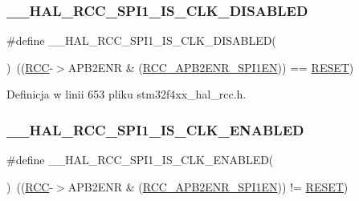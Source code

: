 \subsubsection{\texorpdfstring{\+\_\+\+\_\+\+H\+A\+L\+\_\+\+R\+C\+C\+\_\+\+S\+P\+I1\+\_\+\+I\+S\+\_\+\+C\+L\+K\+\_\+\+D\+I\+S\+A\+B\+L\+ED}{\_\_HAL\_RCC\_SPI1\_IS\_CLK\_DISABLED}}
{\footnotesize\ttfamily \#define \+\_\+\+\_\+\+H\+A\+L\+\_\+\+R\+C\+C\+\_\+\+S\+P\+I1\+\_\+\+I\+S\+\_\+\+C\+L\+K\+\_\+\+D\+I\+S\+A\+B\+L\+ED(\begin{DoxyParamCaption}{ }\end{DoxyParamCaption})~((\hyperlink{group___peripheral__declaration_ga74944438a086975793d26ae48d5882d4}{R\+CC}-\/$>$A\+P\+B2\+E\+NR \& (\hyperlink{group___peripheral___registers___bits___definition_gae08a3510371b9234eb96369c91d3552f}{R\+C\+C\+\_\+\+A\+P\+B2\+E\+N\+R\+\_\+\+S\+P\+I1\+EN})) == \hyperlink{group___exported__types_gga89136caac2e14c55151f527ac02daaffa589b7d94a3d91d145720e2fed0eb3a05}{R\+E\+S\+ET})}



Definicja w linii 653 pliku stm32f4xx\+\_\+hal\+\_\+rcc.\+h.

\mbox{\label{group___r_c_c___a_p_b2___peripheral___clock___enable___disable___status_gab1787d7cdf591c099b8d96848aee835e}} 
\subsubsection{\texorpdfstring{\+\_\+\+\_\+\+H\+A\+L\+\_\+\+R\+C\+C\+\_\+\+S\+P\+I1\+\_\+\+I\+S\+\_\+\+C\+L\+K\+\_\+\+E\+N\+A\+B\+L\+ED}{\_\_HAL\_RCC\_SPI1\_IS\_CLK\_ENABLED}}
{\footnotesize\ttfamily \#define \+\_\+\+\_\+\+H\+A\+L\+\_\+\+R\+C\+C\+\_\+\+S\+P\+I1\+\_\+\+I\+S\+\_\+\+C\+L\+K\+\_\+\+E\+N\+A\+B\+L\+ED(\begin{DoxyParamCaption}{ }\end{DoxyParamCaption})~((\hyperlink{group___peripheral__declaration_ga74944438a086975793d26ae48d5882d4}{R\+CC}-\/$>$A\+P\+B2\+E\+NR \& (\hyperlink{group___peripheral___registers___bits___definition_gae08a3510371b9234eb96369c91d3552f}{R\+C\+C\+\_\+\+A\+P\+B2\+E\+N\+R\+\_\+\+S\+P\+I1\+EN})) != \hyperlink{group___exported__types_gga89136caac2e14c55151f527ac02daaffa589b7d94a3d91d145720e2fed0eb3a05}{R\+E\+S\+ET})}



